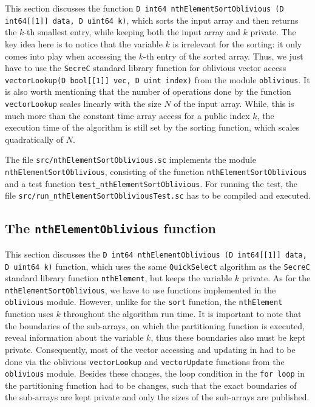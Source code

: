 \documentclass[11pt]{article}
\newcommand{\ct}[1]{\texttt{#1}}
\newcommand{\SC}{\ct{SecreC}\xspace}
\begin{document}
This section discusses the function \ct{D int64 nthElementSortOblivious (D int64[[1]] data, D uint64 k)}, which sorts the input array and then returns the $k$-th smallest entry, while keeping both the input array and $k$ private. The key idea here is to notice that the variable $k$ is irrelevant for the sorting: it only comes into play when accessing the $k$-th entry of the sorted array. Thus, we just have to use the \SC standard library function for oblivious vector access \ct{vectorLookup(D bool[[1]] vec, D uint index)} from the module \ct{oblivious}. It is also worth mentioning that the number of operations done by the function \ct{vectorLookup} scales linearly with the size $N$ of the input array. While, this is much more than the constant time array access for a public index $k$, the execution time of the algorithm is still set by the sorting function, which scales quadratically of $N$.

The file \ct{src/nthElementSortOblivious.sc} implements the module \ct{nthElementSortOblivious}, consisting of the function \ct{nthElementSortOblivious} and a test function \ct{test\_nthElementSortOblivious}. For running the test, the file \ct{src/run\_nthElementSortObliviousTest.sc} has to be compiled and executed.


\subsection{The \ct{nthElementOblivious} function} %
\label{sub:the_nthelementoblivious_function}

This section discusses the \ct{D int64 nthElementOblivious (D int64[[1]] data, D uint64 k)} function, which uses the same \ct{QuickSelect} algorithm as the \SC standard library function \ct{nthElement}, but keeps the variable $k$ private. As for the \ct{nthElementSortOblivious}, we have to use functions implemented in the \ct{oblivious} module. However, unlike for the \ct{sort} function, the \ct{nthElement} function uses $k$ throughout the algorithm run time. It is important to note that the boundaries of the sub-arrays, on which the partitioning function is executed, reveal information about the variable $k$, thus these boundaries also must be kept private. Consequently, most of the vector accessing and updating in had to be done via the oblivious \ct{vectorLookup} and \ct{vectorUpdate} functions from the \ct{oblivious} module. Besides these changes, the loop condition in the \ct{for loop} in the partitioning function had to be changes, such that the exact boundaries of the sub-arrays are kept private and only the sizes of the sub-arrays are published.   
\end{document}
